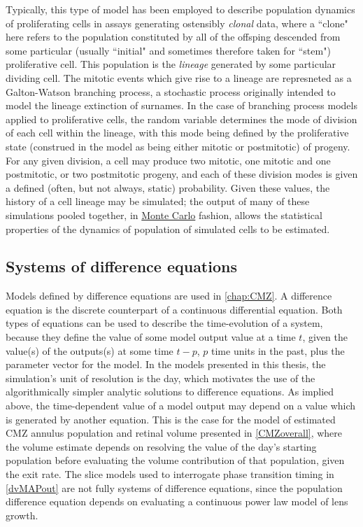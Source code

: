 Typically, this type of model has been employed to describe population dynamics of proliferating cells in assays generating ostensibly \textit{clonal} data, where a ``clone" here refers to the population constituted by all of the offsping descended from some particular (usually ``initial" and sometimes therefore taken for ``stem") proliferative cell. This population is the \textit{lineage} generated by some particular dividing cell. The mitotic events which give rise to a lineage are represneted as a Galton-Watson branching process, a stochastic process originally intended to model the lineage extinction of surnames. In the case of branching process models applied to proliferative cells, the random variable determines the mode of division of each cell within the lineage, with this mode being defined by the proliferative state (construed in the model as being either mitotic or postmitotic) of progeny. For any given division, a cell may produce two mitotic, one mitotic and one postmitotic, or two postmitotic progeny, and each of these division modes is given a defined (often, but not always, static) probability. Given these values, the history of a cell lineage may be simulated; the output of many of these simulations pooled together, in \hyperref[ssec:MonteCarlo]{Monte Carlo} fashion, allows the statistical properties of the dynamics of population of simulated cells to be estimated.

\subsection{Systems of difference equations}
\label{ssec:SODE}
Models defined by difference equations are used in \autoref{chap:CMZ}. A difference equation is the discrete counterpart of a continuous differential equation. Both types of equations can be used to describe the time-evolution of a system, because they define the value of some model output value at a time $t$, given the value(s) of the outputs(s) at some time $t-p$, $p$ time units in the past, plus the parameter vector for the model. In the models presented in this thesis, the simulation's unit of resolution is the day, which motivates the use of the algorithmically simpler analytic solutions to difference equations. As implied above, the time-dependent value of a model output may depend on a value which is generated by another equation. This is the case for the model of estimated CMZ annulus population and retinal volume presented in \autoref{CMZoverall}, where the volume estimate depends on resolving the value of the day's starting population before evaluating the volume contribution of that population, given the exit rate. The slice models used to interrogate phase transition timing in \autoref{dvMAPout} are not fully systems of difference equations, since the population difference equation depends on evaluating a continuous power law model of lens growth. 

